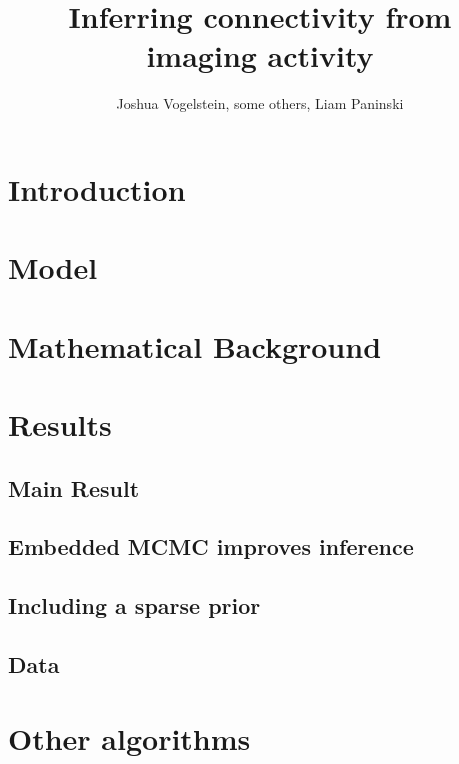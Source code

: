 
\newcommand{\f}{f_{\thet}}
\newcommand{\g}{g_{\thet}}
\newcommand{\x}{\ve{x}}
\newcommand{\y}{\ve{y}}
\newcommand{\h}{\ve{h}}
\newcommand{\xT}{\x} %
\newcommand{\yT}{\y}
\newcommand{\fhat}{\widetilde{f}_{\thet} \big(\x_t^{(l)} | \x_{t-1}^{(m)}\big)}
\newcommand{\ppi}{\pi_{\thet}}
\newcommand{\phat}{\widehat{P}_{\thetn}(F_v | \Ca_t)}
\usepackage{hyperref}               %

\title{Inferring connectivity from imaging activity}
\author{Joshua Vogelstein, some others,  Liam Paninski}



\maketitle

\begin{abstract}

\end{abstract}

\section{Introduction}


\section{Model}


\section{Mathematical Background}


\section{Results}

\subsection{Main Result}


\subsection{Embedded MCMC improves inference}


\subsection{Including a sparse prior}
%

\subsection{Data}

\section{Other algorithms}




%


